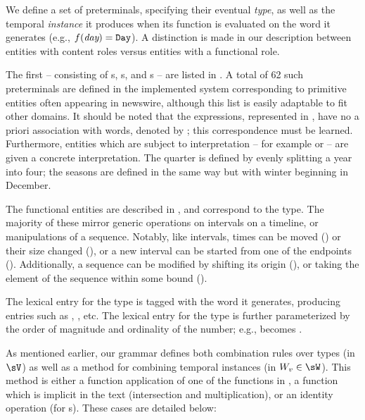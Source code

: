 We define a set of preterminals, specifying their eventual
	\textit{type}, as well as the temporal \textit{instance} it
	produces when its function is evaluated on the word it generates
	(e.g., $f(\textit{day}) = \texttt{Day}$).
A distinction is made in our description between entities with 
	content roles versus entities with a functional role.

The first -- consisting of s, s, and s --
	are listed in .
A total of 62 such preterminals are defined in the implemented system
	corresponding to primitive entities often appearing in newswire,
	although this list is easily adaptable to fit other domains.
It should be noted that the expressions, represented in ,
	have no a priori association with words, denoted by ;
	this correspondence must be learned.
Furthermore, entities which are subject to interpretation -- for example
	 or  -- are given a concrete interpretation.
The  quarter is defined by evenly splitting a year into four;
	the seasons are defined in the same way but with winter beginning in December.

The functional entities are described in , and correspond to
	the  type.
The majority of these mirror generic operations on intervals on a timeline,
	or manipulations of a sequence.
Notably, like intervals, times can be moved () or
	their size changed (), or
	a new interval can be started from one of the endpoints
	().
Additionally, a sequence can be modified by shifting its origin
	(), 
	or taking the  element of the sequence within some bound
	().

The lexical entry for the  type is tagged with the word it
	generates, producing entries such as , , etc.
The lexical entry for the  type is further parameterized by
	the order of magnitude and ordinality of the number; e.g.,
	 becomes .


As mentioned earlier, our grammar defines both combination rules
	over types (in $\sV$) as well as a method for combining temporal
	instances (in $W_v \in \sW$).
This method is either a function application of one of the functions in
	, a function which is implicit in the text
	(intersection and multiplication), or an identity operation (for s).
These cases are detailed below:


